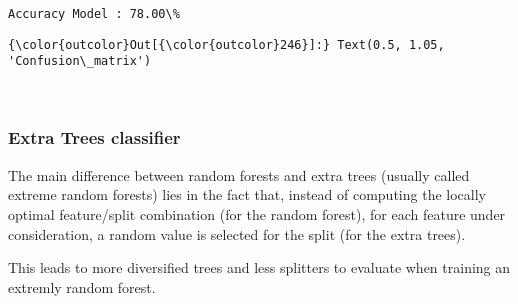 \documentclass[11pt]{article}
\begin{document}
    \begin{Verbatim}[commandchars=\\\{\}]
Accuracy Model : 78.00\% 

    \end{Verbatim}

\begin{Verbatim}[commandchars=\\\{\}]
{\color{outcolor}Out[{\color{outcolor}246}]:} Text(0.5, 1.05, 'Confusion\_matrix')
\end{Verbatim}
            
    \begin{center}
    \end{center}
    { \hspace*{\fill} \\}
    
    \subsubsection{Extra Trees classifier}\label{extra-trees-classifier}

    The main difference between random forests and extra trees (usually
called extreme random forests) lies in the fact that, instead of
computing the locally optimal feature/split combination (for the random
forest), for each feature under consideration, a random value is
selected for the split (for the extra trees).

This leads to more diversified trees and less splitters to evaluate when
training an extremly random forest.
\end{document}
